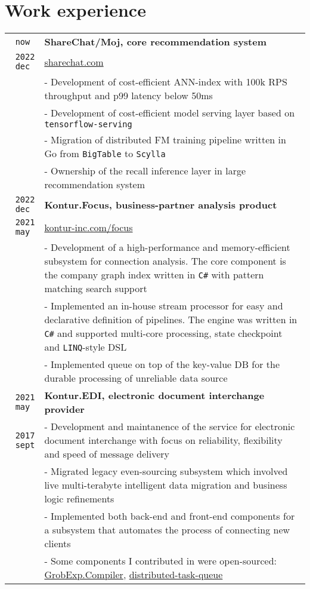\documentclass[10pt,a4paper]{article}
\begin{document}
\section{Work experience}
\vspace{1mm}
\begin{tabular}{r p{14cm}}
	\texttt{now{ }} & \textbf{ShareChat/Moj, core recommendation system}\\
	\texttt{2022 dec{ }} & \href{https://sharechat.com/}{sharechat.com}\\
	& \small{- Development of cost-efficient ANN-index with 100k RPS throughput and p99 latency below 50ms}\\
	& \small{- Development of cost-efficient model serving layer based on \texttt{tensorflow-serving}}\\
	& \small{- Migration of distributed FM training pipeline written in Go from \texttt{BigTable} to \texttt{Scylla}}\\
	& \small{- Ownership of the recall inference layer in large recommendation system}\\

	\texttt{2022 dec{ }} & \textbf{Kontur.Focus, business-partner analysis product}\\
	\texttt{2021 may{ }} & \href{https://kontur-inc.com/focus}{kontur-inc.com/focus}\\
	& \small{- Development of a high-performance and memory-efficient subsystem for connection analysis. The core component is the company graph index written in \texttt{C\#} with pattern matching search support}\\
	& \small{- Implemented an in-house stream processor for easy and declarative definition of pipelines. The engine was written in \texttt{C\#} and supported multi-core processing, state checkpoint and \texttt{LINQ}-style DSL}\\
	& \small{- Implemented queue on top of the key-value DB for the durable processing of unreliable data source}\\

    \texttt{2021 may{ }} & \textbf{Kontur.EDI, electronic document interchange provider} \\
    \texttt{2017 sept} & \small{- Development and maintanence of the service for electronic document interchange with focus on reliability, flexibility and speed of message delivery}\\
    & \small{- Migrated legacy even-sourcing subsystem which involved live multi-terabyte intelligent data migration and business logic refinements}\\
    & \small{- Implemented both back-end and front-end components for a subsystem that automates the process of connecting new clients}\\
    & \small{- Some components I contributed in were open-sourced: \href{https://github.com/skbkontur/GrobExp.Compiler}{GrobExp.Compiler}, \href{https://github.com/skbkontur/cassandra-distributed-task-queue}{distributed-task-queue}}\\
\end{tabular}
\end{document}
